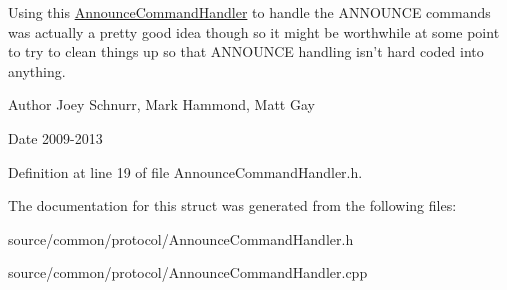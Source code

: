 Using this \hyperlink{struct_picto_1_1_announce_command_handler}{Announce\-Command\-Handler} to handle the A\-N\-N\-O\-U\-N\-C\-E commands was actually a pretty good idea though so it might be worthwhile at some point to try to clean things up so that A\-N\-N\-O\-U\-N\-C\-E handling isn't hard coded into anything. \begin{DoxyAuthor}{Author}
Joey Schnurr, Mark Hammond, Matt Gay 
\end{DoxyAuthor}
\begin{DoxyDate}{Date}
2009-\/2013 
\end{DoxyDate}


Definition at line 19 of file Announce\-Command\-Handler.\-h.



The documentation for this struct was generated from the following files\-:\begin{DoxyCompactItemize}
\item 
source/common/protocol/Announce\-Command\-Handler.\-h\item 
source/common/protocol/Announce\-Command\-Handler.\-cpp\end{DoxyCompactItemize}
